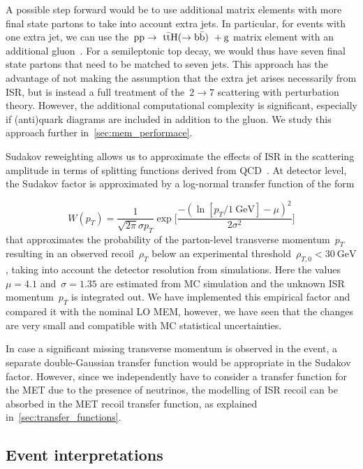 A possible step forward would be to use additional matrix elements with more final state partons to take into account extra jets. In particular, for events with one extra jet, we can use the~$\mathrm{pp} \rightarrow~\mathrm{t} \bar{\mathrm{t}} \mathrm{H} (\rightarrow \mathrm{b}\bar{\mathrm{b}})~+ \mathrm{g}$ matrix element with an additional gluon~\cite{Cascioli:2011va}. For a semileptonic top decay, we would thus have seven final state partons that need to be matched to seven jets. This approach has the advantage of not making the assumption that the extra jet arises necessarily from ISR, but is instead a full treatment of the~$2 \rightarrow 7$ scattering with perturbation theory. However, the additional computational complexity is significant, especially if (anti)quark diagrams are included in addition to the gluon. We study this approach further in~\cref{sec:mem_performace}.

Sudakov reweighting allows us to approximate the effects of ISR in the scattering amplitude in terms of splitting functions derived from QCD~\cite{Alwall:2010cq}. At detector level, the Sudakov factor is approximated by a log-normal transfer function of the form

\begin{equation}
W(p_T) = \frac{1}{\sqrt{2\pi} \sigma p_T} \exp \biggl[ \frac{-(\ln{[p_T/1~\mathrm{GeV}]} - \mu)^2}{2\sigma^2}\biggr]
\end{equation}
that approximates the probability of the parton-level transverse momentum~$p_T$ resulting in an observed recoil~$\rho_T$ below an experimental threshold~$\rho_{T,0} < 30~\mathrm{GeV}$, taking into account the detector resolution from simulations. Here the values~$\mu = 4.1$ and~$\sigma = 1.35$ are estimated from MC simulation and the unknown ISR momentum~$p_T$ is integrated out. We have implemented this empirical factor and compared it with the nominal LO MEM, however, we have seen that the changes are very small and compatible with MC statistical uncertainties.

In case a significant missing transverse momentum is observed in the event, a separate double-Gaussian transfer function would be appropriate in the Sudakov factor. However, since we independently have to consider a transfer function for the MET due to the presence of neutrinos, the modelling of ISR recoil can be absorbed in the MET recoil transfer function, as explained in~\cref{sec:transfer_functions}.

\subsection{Event interpretations}
\label{sec:event_interpretation}

